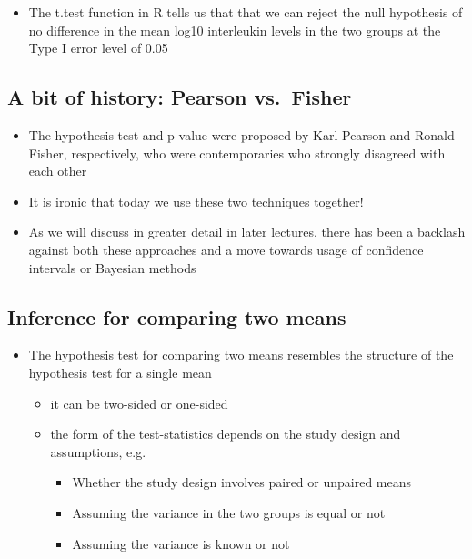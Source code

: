 \documentclass[
]{book}
\providecommand{\tightlist}{%
  \setlength{\itemsep}{0pt}\setlength{\parskip}{0pt}}
\begin{document}
\begin{itemize}
\tightlist
\item
  The t.test function in R tells us that that we can reject the null hypothesis of no difference in the mean log10 interleukin levels in the two groups at the Type I error level of 0.05
\end{itemize}

\hypertarget{a-bit-of-history-pearson-vs.-fisher}{%
\subsection{A bit of history: Pearson vs.~Fisher}\label{a-bit-of-history-pearson-vs.-fisher}}

\begin{itemize}
\tightlist
\item
  The hypothesis test and p-value were proposed by Karl Pearson and Ronald Fisher, respectively, who were contemporaries who strongly disagreed with each other
\item
  It is ironic that today we use these two techniques together!
\item
  As we will discuss in greater detail in later lectures, there has been a backlash against both these approaches and a move towards usage of confidence intervals or Bayesian methods
\end{itemize}

\hypertarget{inference-for-comparing-two-means}{%
\subsection{Inference for comparing two means}\label{inference-for-comparing-two-means}}

\begin{itemize}
\tightlist
\item
  The hypothesis test for comparing two means resembles the structure of the hypothesis test for a single mean

  \begin{itemize}
  \tightlist
  \item
    it can be two-sided or one-sided
  \item
    the form of the test-statistics depends on the study design and assumptions, e.g.

    \begin{itemize}
    \tightlist
    \item
      Whether the study design involves paired or unpaired means
    \item
      Assuming the variance in the two groups is equal or not
    \item
      Assuming the variance is known or not
    \end{itemize}
  \end{itemize}
\end{itemize}
\end{document}
